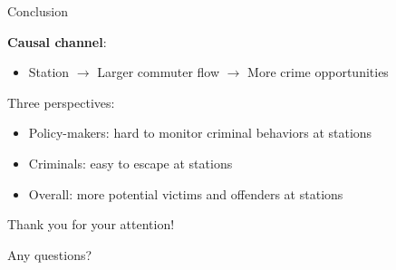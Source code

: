 \documentclass{beamer}
\begin{document}
\begin{frame}{Conclusion}

\textbf{Causal channel}: 
\begin{itemize}
    \item Station $\to$ Larger commuter flow $\to$ More crime opportunities
\end{itemize}

\vspace{1em}

Three perspectives:

\begin{itemize}
    \item Policy-makers: hard to monitor criminal behaviors at stations
    \item Criminals: easy to escape at stations
    \item Overall: more potential victims and offenders at stations
\end{itemize}




\end{frame}

\begin{frame}

\begin{center}
\begin{huge}
Thank you for your attention!

\vspace{4mm}
Any questions?
\end{huge}

\end{center}


\end{frame}
\end{document}
